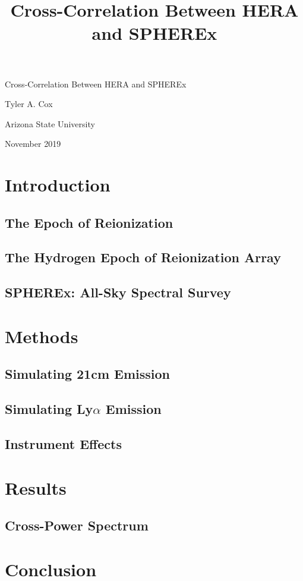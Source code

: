 \documentclass[12pt]{article}
\title{Cross-Correlation Between HERA and SPHEREx}
\begin{document}
\vspace*{0.25\textheight}
\begin{center}
{\Large Cross-Correlation Between HERA and SPHEREx}
\end{center}
\begin{center}
Tyler A. Cox \par
Arizona State University \par
November 2019 \par
\end{center}

\newpage

\begin{abstract}

\end{abstract}

\newpage

\tableofcontents

\newpage

\section{Introduction}
\subsection{The Epoch of Reionization}
\lipsum[2-4]
\subsection{The Hydrogen Epoch of Reionization Array}
\lipsum[2-4]
\subsection{SPHEREx: All-Sky Spectral Survey}
\lipsum[2-4]

\section{Methods}
\subsection{Simulating 21cm Emission}
\lipsum[2-4]
\subsection{Simulating Ly$\alpha$ Emission}
\lipsum[2-4]
\subsection{Instrument Effects}
\lipsum[2-4]

\section{Results}
\subsection{Cross-Power Spectrum}
\lipsum[2-4]

\section{Conclusion}
\end{document}
